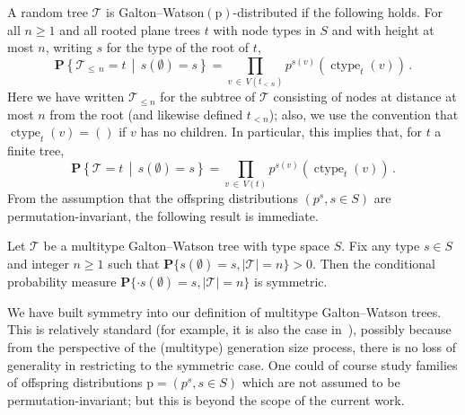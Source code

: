 \documentclass[AHL,Unicode,longabstracts,published]{cedram}
\newcommand{\cT}{\mathcal{T}}
\newcommand{\bP}{\mathbf{P}}
\newcommand{\rp}{\mathrm{p}}
\DeclareMathOperator{\cht}{ctype}
\newcommand{\p}[1]{\mathbf{P}\left\{#1\right\}}
\begin{document}
A random tree $\cT$ is Galton--Watson$(\rp)$-distributed if the following holds. For all $n \ge 1$ and all rooted plane trees $t$ with node types in $S$ and with height at most $n$, writing $s$ for the type of the root of $t$,
\[
\p{\cT_{\le\,n} = t\,\middle|\,s(\emptyset)=s} = \prod_{v\,\in\, V(t_{<\,n})} p^{s(v)}(\cht_t(v))\,.
\]
Here we have written $\cT_{\le n}$ for the subtree of $\cT$ consisting of nodes at distance at most $n$ from the root (and likewise defined $t_{<n}$); also, we use the convention that $\cht_t(v)=()$ if $v$ has no children. In particular, this implies that, for $t$ a finite tree,
\[
\p{\cT = t\,\middle|\,s(\emptyset)=s} = \prod_{v\,\in\,V(t)} p^{s(v)}(\cht_t(v))\,.
\]
From the assumption that the offspring distributions $(p^s,s \in S)$ are permutation-invariant, the following result is immediate.

\begin{prop}\label{prop:GWSym}
Let $\cT$ be a multitype Galton--Watson tree with type space $S$. Fix any type $s \in S$ and integer $n \ge 1$ such that $\bP\{s(\emptyset)=s,|\cT|=n\}>0$. Then the conditional probability measure $\bP\{\cdot s(\emptyset)=s,|\cT|=n\}$ is symmetric.
\end{prop}


\begin{rema}
We have built symmetry into our definition of multitype Galton--Watson trees. This is relatively standard (for example, it is also the case in~\cite{MiermontInvarianceTrees}), possibly because from the perspective of the (multitype) generation size process, there is no loss of generality in restricting to the symmetric case. One could of course study families of offspring distributions $\rp=(p^s,s \in S)$ which are not assumed to be permutation-invariant; but this is beyond the scope of the current work.
\end{rema}
\end{document}
